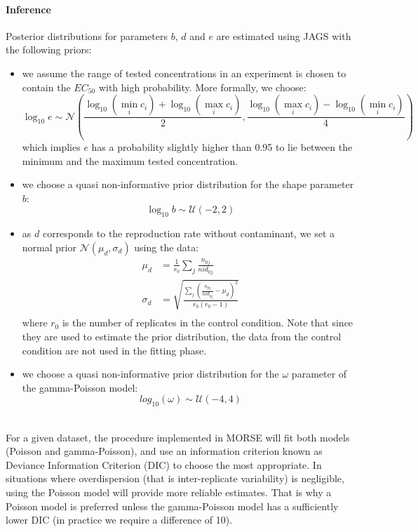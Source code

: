 \documentclass{article}
\begin{document}
\paragraph{Inference} Posterior distributions for parameters $b$,
$d$ and $e$ are estimated using JAGS with the following priors:
\begin{itemize}
\item we assume the range of tested concentrations in an
  experiment is chosen to contain the $EC_{50}$ with high
  probability. More formally, we choose:
  $$\log_{10} e \sim \mathcal{N}(\frac{\log_{10} (\min_i c_i) + \log_{10} (\max_i c_i)}{2}, \frac{\log_{10} (\max_i c_i) - \log_{10} (\min_i c_i)}{4})$$
  which implies $e$ has a probability slightly higher than 0.95 to lie
  between the minimum and the maximum tested concentration.
\item we choose a quasi non-informative prior distribution for the
  shape parameter $b$:
  $$\log_{10} b \sim \mathcal{U}(-2,2)$$

\item
  as $d$ corresponds to the reproduction rate without contaminant, we
  set a normal prior $\mathcal{N}(\mu_d,\sigma_d)$ using the data:
  \begin{align*}
    \mu_d & = \frac{1}{r_0} \sum_j \frac{n_{0j}}{nid_{0j}}\\
    \sigma_d & = \sqrt{\frac{\sum_j (\frac{n_{0j}}{nid_{0j}} - \mu_d)^2}{r_0(r_0 - 1)}}\\
  \end{align*}
  where $r_0$ is the number of replicates in the control
  condition. Note that since they are used to estimate the prior
  distribution, the data from the control condition are not used in the
  fitting phase.

\item we choose a quasi non-informative prior distribution for the
  $\omega$ parameter of the gamma-Poisson model:
$$log_{10}(\omega) \sim \mathcal{U}(-4,4)$$
\end{itemize}
\begin{align*}
\end{align*}

For a given dataset, the procedure implemented in MORSE will fit both
models (Poisson and gamma-Poisson), and use an information criterion
known as Deviance Information Criterion (DIC) to choose the most
appropriate. In situations where overdispersion (that is
inter-replicate variability) is negligible, using the Poisson model
will provide more reliable estimates. That is why a Poisson model is
preferred unless the gamma-Poisson model has a sufficiently lower DIC
(in practice we require a difference of 10).



\end{document}
